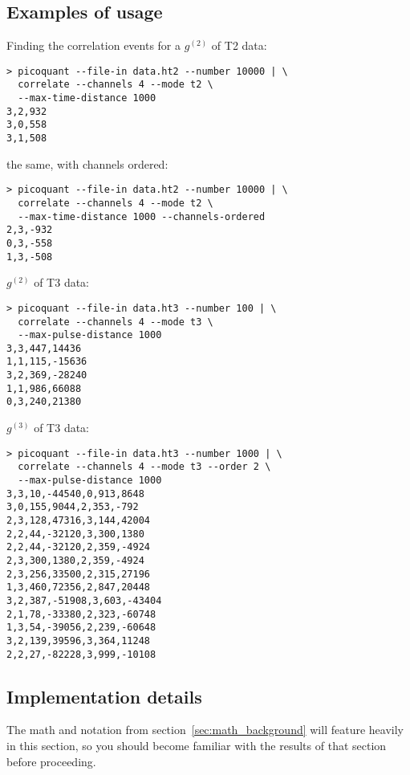 \documentclass{article}
\newcommand{\gn}[1]{\ensuremath{g^{(#1)}}}
\begin{document}
\subsection{Examples of usage}
Finding the correlation events for a \gn{2} of T2 data:
\begin{verbatim}
> picoquant --file-in data.ht2 --number 10000 | \
  correlate --channels 4 --mode t2 \
  --max-time-distance 1000
3,2,932
3,0,558
3,1,508
\end{verbatim}
the same, with channels ordered:
\begin{verbatim}
> picoquant --file-in data.ht2 --number 10000 | \
  correlate --channels 4 --mode t2 \
  --max-time-distance 1000 --channels-ordered
2,3,-932
0,3,-558
1,3,-508
\end{verbatim}
\gn{2} of T3 data:
\begin{verbatim}
> picoquant --file-in data.ht3 --number 100 | \
  correlate --channels 4 --mode t3 \
  --max-pulse-distance 1000
3,3,447,14436
1,1,115,-15636
3,2,369,-28240
1,1,986,66088
0,3,240,21380
\end{verbatim}
\gn{3} of T3 data:
\begin{verbatim}
> picoquant --file-in data.ht3 --number 1000 | \
  correlate --channels 4 --mode t3 --order 2 \
  --max-pulse-distance 1000
3,3,10,-44540,0,913,8648
3,0,155,9044,2,353,-792
2,3,128,47316,3,144,42004
2,2,44,-32120,3,300,1380
2,2,44,-32120,2,359,-4924
2,3,300,1380,2,359,-4924
2,3,256,33500,2,315,27196
1,3,460,72356,2,847,20448
3,2,387,-51908,3,603,-43404
2,1,78,-33380,2,323,-60748
1,3,54,-39056,2,239,-60648
3,2,139,39596,3,364,11248
2,2,27,-82228,3,999,-10108
\end{verbatim}

\subsection{Implementation details}
\label{sec:correlation_implementation}
The math and notation from section~\ref{sec:math_background} will feature heavily in this section, so you should become familiar with the results of that section before proceeding. 
\end{document}

